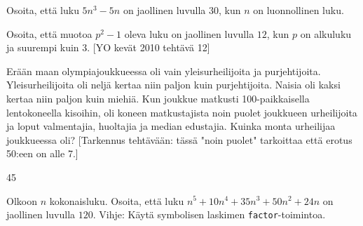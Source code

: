 \begin{tehtava}
    Osoita, että luku $5n^3 - 5n$ on jaollinen luvulla $30$, kun $n$ on luonnollinen luku.
\end{tehtava}

\begin{tehtava}
    Osoita, että muotoa $p^2 - 1$ oleva luku on jaollinen luvulla $12$, kun $p$ on alkuluku ja suurempi kuin $3$. [YO kevät 2010 tehtävä 12]
\end{tehtava}

\begin{tehtava}
    Erään maan olympiajoukkueessa oli vain yleisurheilijoita ja
    purjehtijoita. Yleisurheilijoita oli neljä kertaa niin paljon kuin
    purjehtijoita. Naisia oli kaksi kertaa niin paljon kuin miehiä.
    Kun joukkue matkusti 100-paikkaisella lentokoneella kisoihin,
    oli koneen matkustajista noin puolet joukkueen urheilijoita ja
    loput valmentajia, huoltajia ja median edustajia. Kuinka monta
    urheilijaa joukkueessa oli? [Tarkennus tehtävään: tässä "noin puolet" tarkoittaa että erotus 50:een on alle 7.] %
    
    \begin{vastaus}
        45
    \end{vastaus}
    
\end{tehtava}

\begin{tehtava}
    Olkoon $n$ kokonaisluku. Osoita, että luku $n^5+10n^4+35n^3+50n^2+24n$ on jaollinen luvulla $120$. Vihje: Käytä symbolisen laskimen {\tt factor}-toimintoa.
\end{tehtava}